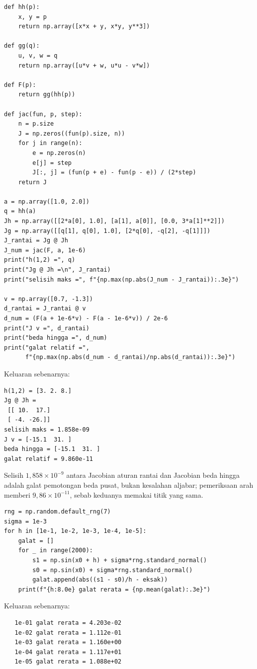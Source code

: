 \begin{lab}
\begin{verbatim}
def hh(p):
    x, y = p
    return np.array([x*x + y, x*y, y**3])

def gg(q):
    u, v, w = q
    return np.array([u*v + w, u*u - v*w])

def F(p):
    return gg(hh(p))

def jac(fun, p, step):
    n = p.size
    J = np.zeros((fun(p).size, n))
    for j in range(n):
        e = np.zeros(n)
        e[j] = step
        J[:, j] = (fun(p + e) - fun(p - e)) / (2*step)
    return J

a = np.array([1.0, 2.0])
q = hh(a)
Jh = np.array([[2*a[0], 1.0], [a[1], a[0]], [0.0, 3*a[1]**2]])
Jg = np.array([[q[1], q[0], 1.0], [2*q[0], -q[2], -q[1]]])
J_rantai = Jg @ Jh
J_num = jac(F, a, 1e-6)
print("h(1,2) =", q)
print("Jg @ Jh =\n", J_rantai)
print("selisih maks =", f"{np.max(np.abs(J_num - J_rantai)):.3e}")

v = np.array([0.7, -1.3])
d_rantai = J_rantai @ v
d_num = (F(a + 1e-6*v) - F(a - 1e-6*v)) / 2e-6
print("J v =", d_rantai)
print("beda hingga =", d_num)
print("galat relatif =",
      f"{np.max(np.abs(d_num - d_rantai)/np.abs(d_rantai)):.3e}")
\end{verbatim}
Keluaran sebenarnya:
\begin{verbatim}
h(1,2) = [3. 2. 8.]
Jg @ Jh =
 [[ 10.  17.]
 [ -4. -26.]]
selisih maks = 1.858e-09
J v = [-15.1  31. ]
beda hingga = [-15.1  31. ]
galat relatif = 9.860e-11
\end{verbatim}
\end{lab}

Selisih $1{,}858\times10^{-9}$ antara Jacobian aturan rantai dan Jacobian beda hingga adalah
galat pemotongan beda pusat, bukan kesalahan aljabar; pemeriksaan arah memberi
$9{,}86\times10^{-11}$, sebab keduanya memakai titik yang sama.

\begin{lab}
\begin{verbatim}
rng = np.random.default_rng(7)
sigma = 1e-3
for h in [1e-1, 1e-2, 1e-3, 1e-4, 1e-5]:
    galat = []
    for _ in range(2000):
        s1 = np.sin(x0 + h) + sigma*rng.standard_normal()
        s0 = np.sin(x0) + sigma*rng.standard_normal()
        galat.append(abs((s1 - s0)/h - eksak))
    print(f"{h:8.0e} galat rerata = {np.mean(galat):.3e}")
\end{verbatim}
Keluaran sebenarnya:
\begin{verbatim}
   1e-01 galat rerata = 4.203e-02
   1e-02 galat rerata = 1.112e-01
   1e-03 galat rerata = 1.160e+00
   1e-04 galat rerata = 1.117e+01
   1e-05 galat rerata = 1.088e+02
\end{verbatim}
\end{lab}

